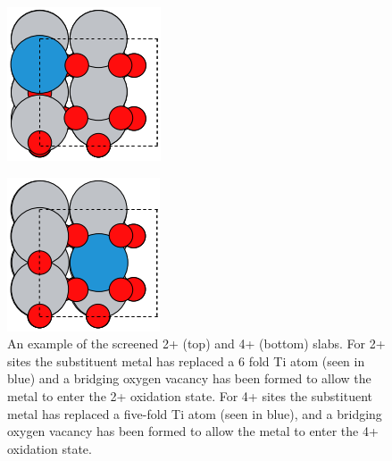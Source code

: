 \begin{figure}
    \centering
    \includegraphics[width=0.5\linewidth]{Images/ex_2+_slab.png}
    \label{fig:2+_ex_slab}

    \centering
    \includegraphics[width=0.5\linewidth]{Images/ex_4+_slab.png}
    \caption{An example of the screened 2+ (top) and 4+ (bottom) slabs. For 2+ sites the substituent metal has replaced a 6 fold Ti atom (seen in blue) and a bridging oxygen vacancy has been formed to allow the metal to enter the 2+ oxidation state.  For 4+ sites the substituent metal has replaced a five-fold Ti atom (seen in blue), and a bridging oxygen vacancy has been formed to allow the metal to enter the 4+ oxidation state.}
    \label{fig:2+ex_slab}
\end{figure}


